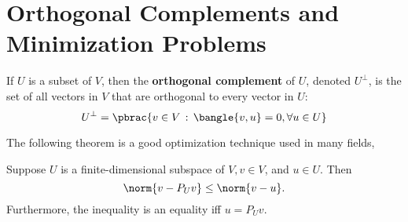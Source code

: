\section{Orthogonal Complements and Minimization Problems}

\begin{definition}
  If $U$ is a subset of $V$, then the \textbf{orthogonal complement} of $U$, denoted $U^\perp$, is the set of all vectors in $V$ that are orthogonal to every vector in $U$:
  \begin{equation}
    U^\perp = \pbrac{
      v \in V \,:\, \bangle{v, u} = 0, \forall u \in U
    }
  \end{equation}
\end{definition}

The following theorem is a good optimization technique used in many fields,
\begin{theorem}
  Suppose $U$ is a finite-dimensional subspace of $V, v\in V$, and $u \in U$. Then
  \begin{equation}
    \norm{
      v - P_Uv
    } \leq
    \norm{
      v -u
    }.
  \end{equation}
  Furthermore, the inequality is an equality iff $u = P_Uv$.
\end{theorem}




